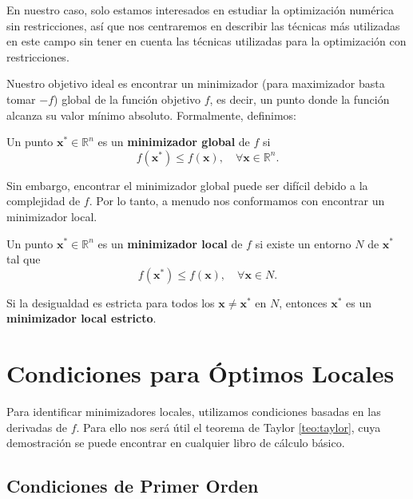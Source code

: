 En nuestro caso, solo estamos interesados en estudiar la optimización numérica sin restricciones, así que nos centraremos en describir las técnicas más utilizadas en este campo sin tener en cuenta las técnicas utilizadas para la optimización con restricciones.

Nuestro objetivo ideal es encontrar un minimizador (para maximizador basta tomar $-f$) global de la función objetivo $f$, es decir, un punto donde la función alcanza su valor mínimo absoluto. Formalmente, definimos:

\begin{definicion}
\label{def:min_global}
Un punto $\mathbf{x}^* \in \mathbb{R}^n$ es un \textbf{minimizador global} de $f$ si
\begin{equation}
f(\mathbf{x}^*) \leq f(\mathbf{x}), \quad \forall \mathbf{x} \in \mathbb{R}^n.
\end{equation}
\end{definicion}

Sin embargo, encontrar el minimizador global puede ser difícil debido a la complejidad de $f$. Por lo tanto, a menudo nos conformamos con encontrar un minimizador local.

\begin{definicion}
\label{def:min_local}
Un punto $\mathbf{x}^* \in \mathbb{R}^n$ es un \textbf{minimizador local} de $f$ si existe un entorno $N$ de $\mathbf{x}^*$ tal que
\begin{equation}
f(\mathbf{x}^*) \leq f(\mathbf{x}), \quad \forall \mathbf{x} \in N.
\end{equation}
\end{definicion}

Si la desigualdad es estricta para todos los $\mathbf{x} \neq \mathbf{x}^*$ en $N$, entonces $\mathbf{x}^*$ es un \textbf{minimizador local estricto}.

\section{Condiciones para Óptimos Locales}

Para identificar minimizadores locales, utilizamos condiciones basadas en las derivadas de $f$. Para ello nos será útil el teorema de Taylor \ref{teo:taylor}, cuya demostración se puede encontrar en cualquier libro de cálculo básico.

\subsection{Condiciones de Primer Orden}

